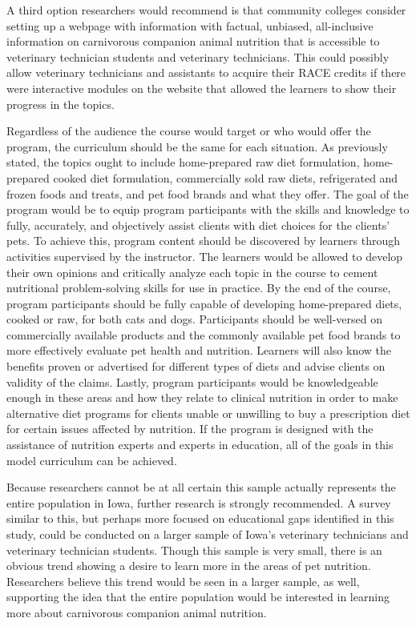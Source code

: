 \par A third option researchers would recommend is that community colleges consider setting up a webpage with information with factual, unbiased, all-inclusive information on carnivorous companion animal nutrition that is accessible to veterinary technician students and veterinary technicians. This could possibly allow veterinary technicians and assistants to acquire their RACE credits if there were interactive modules on the website that allowed the learners to show their progress in the topics.
\par Regardless of the audience the course would target or who would offer the program, the curriculum should be the same for each situation. As previously stated, the topics ought to include home-prepared raw diet formulation, home-prepared cooked diet formulation, commercially sold raw diets, refrigerated and frozen foods and treats, and pet food brands and what they offer. The goal of the program would be to equip program participants with the skills and knowledge to fully, accurately, and objectively assist clients with diet choices for the clients' pets. To achieve this, program content should be discovered by learners through activities supervised by the instructor. The learners would be allowed to develop their own opinions and critically analyze each topic in the course to cement nutritional problem-solving skills for use in practice. By the end of the course, program participants should be fully capable of developing home-prepared diets, cooked or raw, for both cats and dogs. Participants should be well-versed on commercially available products and the commonly available pet food brands to more effectively evaluate pet health and nutrition. Learners will also know the benefits proven or advertised for different types of diets and advise clients on validity of the claims. Lastly, program participants would be knowledgeable enough in these areas and how they relate to clinical nutrition in order to make alternative diet programs for clients unable or unwilling to buy a prescription diet for certain issues affected by nutrition. If the program is designed with the assistance of nutrition experts and experts in education, all of the goals in this model curriculum can be achieved.
\par Because researchers cannot be at all certain this sample actually represents the entire population in Iowa, further research is strongly recommended. A survey similar to this, but perhaps more focused on educational gaps identified in this study, could be conducted on a larger sample of Iowa's veterinary technicians and veterinary technician students. Though this sample is very small, there is an obvious trend showing a desire to learn more in the areas of pet nutrition. Researchers believe this trend would be seen in a larger sample, as well, supporting the idea that the entire population would be interested in learning more about carnivorous companion animal nutrition.


